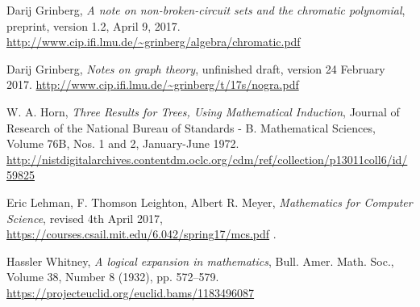 \documentclass[numbers=enddot,12pt,final,onecolumn,notitlepage]{scrartcl}%
\theoremstyle{definition}
\begin{document}
\begin{thebibliography}{999999}

Darij Grinberg,
\textit{A note on non-broken-circuit sets and the chromatic polynomial},
preprint, version 1.2, April 9, 2017.
\newline
\url{http://www.cip.ifi.lmu.de/~grinberg/algebra/chromatic.pdf}

Darij Grinberg,
\textit{Notes on graph theory},
unfinished draft, version 24 February 2017.
\newline
\url{http://www.cip.ifi.lmu.de/~grinberg/t/17s/nogra.pdf}

W. A. Horn,
\textit{Three Results for Trees, Using Mathematical Induction},
Journal of Research of the National Bureau of Standards
- B. Mathematical Sciences,
Volume 76B, Nos. 1 and 2, January-June 1972.
\newline
\url{http://nistdigitalarchives.contentdm.oclc.org/cdm/ref/collection/p13011coll6/id/59825}

Eric Lehman, F. Thomson Leighton, Albert R. Meyer,
\textit{Mathematics for Computer Science},
revised 4th April 2017,
\newline\url{https://courses.csail.mit.edu/6.042/spring17/mcs.pdf} .

Hassler Whitney,
\textit{A logical expansion in mathematics},
Bull. Amer. Math. Soc.,
Volume 38, Number 8 (1932), pp. 572--579.
\newline
\url{https://projecteuclid.org/euclid.bams/1183496087}

\end{thebibliography}
\end{document}
